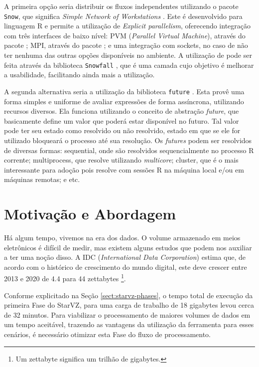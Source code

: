 A primeira opção seria distribuir os fluxos independentes utilizando o pacote 
\texttt{Snow}, que significa \textit{Simple Network of Workstations} 
\cite{ref:snow}. Este é desenvolvido para linguagem R e permite a utilização
de \textit{Explicit parallelism}, oferecendo integração com três interfaces de 
baixo nível: PVM (\textit{Parallel Virtual Machine}), através do pacote 
; MPI, através do pacote  \cite{ref:rmpi}; e uma 
integração com sockets, no caso de não ter nenhuma das outras opções disponíveis 
no ambiente. A utilização de  pode ser feita através da 
biblioteca \texttt{Snowfall} \cite{ref:snowfall}, que é uma camada cujo objetivo 
é melhorar a usabilidade, 
facilitando ainda mais a utilização.

A segunda alternativa seria a utilização da biblioteca \texttt{future} 
\cite{ref:future}. Esta provê uma forma simples e uniforme de avaliar expressões 
de forma assíncrona, utilizando recursos diversos. Ela funciona utilizando o 
conceito de abstração \textit{future}, que basicamente define um valor que 
poderá 
estar disponível no futuro. Tal valor pode ter seu estado como resolvido ou não 
resolvido, estado em que se ele for utilizado bloqueará o processo até sua 
resolução. Os \textit{futures} podem ser resolvidos de diversas formas: 
sequential, onde são resolvidos sequencialmente no processo R corrente; 
multiprocess, que resolve utilizando \textit{multicore}; cluster, que é o mais 
interessante para adoção pois resolve com sessões R na máquina local e/ou em 
máquinas remotas; e etc.

\section{Motivação e Abordagem}\label{sect:motivation}

Há algum tempo, vivemos na era dos dados. O volume armazenado em meios 
eletrônicos é difícil de medir, mas existem alguns estudos que podem nos 
auxiliar a ter uma noção disso. A IDC (\textit{International Data Corporation}) 
\cite{ref:idcdigitaluniverse} estima que, de acordo com o histórico de 
crescimento do mundo digital, este deve crescer entre 2013 e 2020 de 4.4 para 44 
zettabytes \footnote{Um zettabyte significa um trilhão de gigabytes.}.

Conforme explicitado na Seção \ref{sect:starvz-phases}, o tempo total de 
execução da primeira Fase do StarVZ, para uma carga de trabalho de 18 gigabytes 
levou cerca de 32 minutos. Para viabilizar o processamento de maiores volumes de 
dados em um tempo aceitável, trazendo as vantagens da utilização da ferramenta 
para esses cenários, é necessário otimizar esta Fase do fluxo de processamento.


